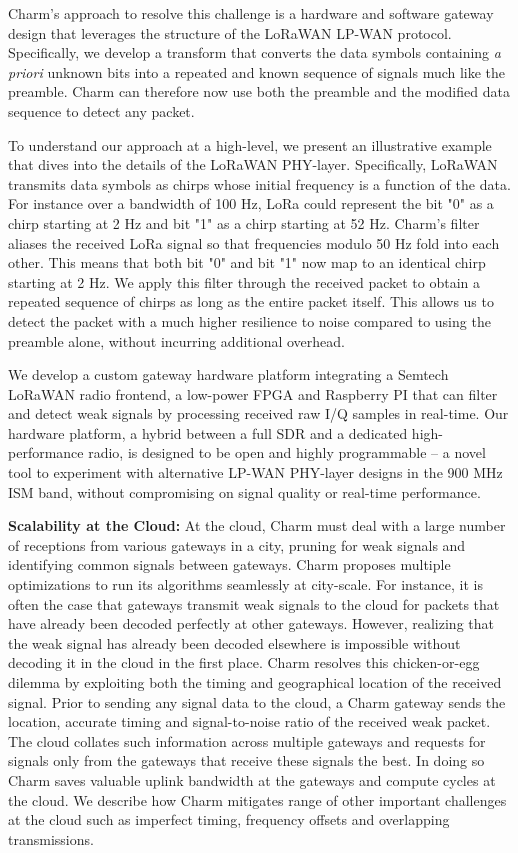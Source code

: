 Charm's approach to resolve this challenge is a hardware and software gateway
design that leverages the structure of the LoRaWAN LP-WAN protocol.
Specifically, we develop a transform that converts the data symbols containing
\textit{a priori} unknown bits into a repeated and known sequence of signals
much like the preamble. Charm can therefore now use both the preamble and the
modified data sequence to detect any packet.

To understand our approach at a high-level, we present an illustrative example
that dives into the details of the LoRaWAN PHY-layer. Specifically, LoRaWAN
transmits data symbols as chirps whose initial frequency is a function of the
data. For instance over a bandwidth of 100 Hz, LoRa could represent the bit
"0" as a chirp starting at 2 Hz and bit "1" as a chirp starting at 52 Hz.
Charm's filter aliases the received LoRa signal so that frequencies modulo 50
Hz fold into each other. This means that both bit "0" and bit "1" now map to
an identical chirp starting at 2 Hz. We apply this filter through
the received packet to obtain a repeated sequence of chirps as long as the
entire packet itself. This allows us to detect the packet with a much higher
resilience to noise compared to using the preamble alone, without incurring
additional overhead.

We develop a custom gateway hardware platform integrating a Semtech LoRaWAN
radio frontend, a low-power FPGA and Raspberry PI that can filter and detect
weak signals by processing received raw I/Q samples in real-time. Our hardware
platform, a hybrid between a full SDR and a dedicated high-performance radio,
is designed to be open and highly programmable -- a novel tool to experiment
with alternative LP-WAN PHY-layer designs in the 900 MHz ISM band, without
compromising on signal quality or real-time performance.

\noindent \textbf{Scalability at the Cloud:} At the cloud, Charm must deal
with a large number of receptions from various gateways in a city, pruning for
weak signals and identifying common signals between gateways. Charm proposes
multiple optimizations to run its algorithms seamlessly at city-scale. For
instance, it is often the case that gateways transmit weak signals to the
cloud for packets that have already been decoded perfectly at other gateways.
However, realizing that the weak signal has already been decoded elsewhere is
impossible without decoding it in the cloud in the first place. Charm resolves
this chicken-or-egg dilemma by exploiting both the timing and geographical
location of the received signal. Prior to sending any signal data to the
cloud, a Charm gateway sends the location, accurate timing and signal-to-noise
ratio of the received weak packet. The cloud collates such information across
multiple gateways and requests for signals only from the gateways that receive
these signals the best. In doing so Charm saves valuable uplink bandwidth at
the gateways and compute cycles at the cloud. We describe how Charm mitigates
range of other important challenges at the cloud such as imperfect timing,
frequency offsets and overlapping transmissions.

